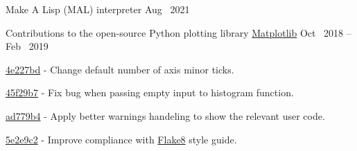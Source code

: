 

\begin{cventries}

  \cventry
  {Make A Lisp (MAL) interpreter} %
    {} %
    {} %
    {Aug \ 2021} %
    {
      \begin{cvitems} %
      \end{cvitems}
    }

  
    \cventryWithTags
    {Contributions to the open-source Python plotting library \hypersetup{urlcolor=blue}\href{https://www.github.com/matplotlib/matplotlib}{Matplotlib}} %
    {} %
    {} %
    {Oct \ 2018 -- Feb \ 2019} %
    { }
    {
      \begin{cvitems}
      \hypersetup{urlcolor=blue}%
    \item \href{https://github.com/matplotlib/matplotlib/commit/4e227bd6f384a57a9f07d296bbf5a7ce04837ef2}{4e227bd} - Change default number of axis minor ticks.
    \item    \href{https://github.com/matplotlib/matplotlib/commit/45f29b76ab6ccdcaca237c1ed52dd68178cc42ad}{45f29b7} - Fix bug when passing empty input to histogram function.
    \item    \href{https://github.com/matplotlib/matplotlib/commit/ad779b4391ae365c0f6424e311317470a70c6972}{ad779b4} - Apply better warnings handeling to show the relevant user code.
    \item    \href{https://github.com/matplotlib/matplotlib/commit/5e2e9c2305c987fc4c9e4b5ee1e181c4fcd054ec}{5e2e9c2} - Improve compliance with \href{https://flake8.pycqa.org/en/latest}{Flake8} style guide.
      \end{cvitems}
    }

  \end{cventries}
